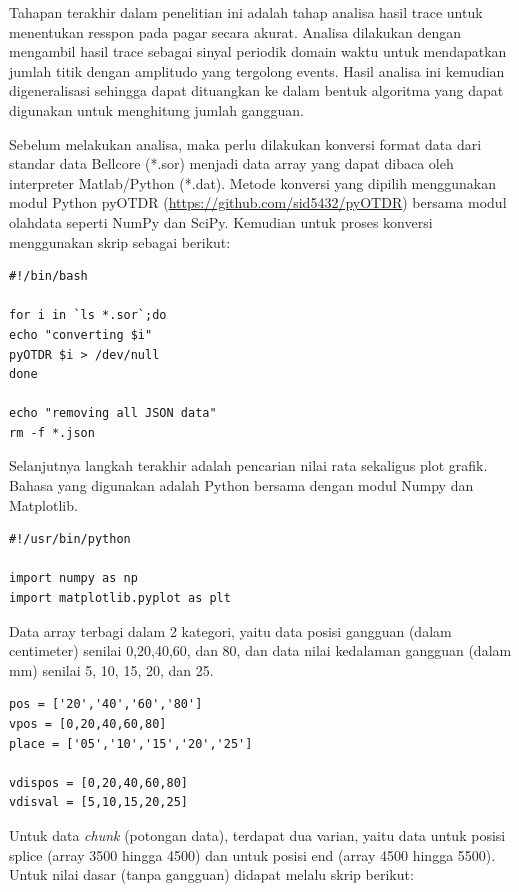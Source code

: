 \documentclass[12pt]{article}
\begin{document}
	Tahapan terakhir dalam penelitian ini adalah tahap analisa hasil trace untuk menentukan	resspon pada pagar secara akurat.
	Analisa dilakukan dengan mengambil hasil trace sebagai sinyal periodik domain waktu untuk mendapatkan jumlah titik dengan amplitudo yang tergolong events.
	Hasil analisa ini kemudian digeneralisasi sehingga dapat dituangkan ke dalam bentuk algoritma yang dapat digunakan untuk menghitung jumlah gangguan.
	
	Sebelum melakukan analisa, maka perlu dilakukan konversi format data dari standar data Bellcore (*.sor) menjadi data array yang dapat dibaca oleh interpreter Matlab/Python (*.dat).
	Metode konversi yang dipilih menggunakan modul Python pyOTDR (\url{https://github.com/sid5432/pyOTDR}) bersama modul olahdata seperti NumPy dan SciPy.
	Kemudian untuk proses konversi menggunakan skrip sebagai berikut:
	
	\begin{verbatim}
#!/bin/bash

for i in `ls *.sor`;do
echo "converting $i"
pyOTDR $i > /dev/null
done

echo "removing all JSON data"
rm -f *.json
	\end{verbatim}
	
	Selanjutnya langkah terakhir adalah pencarian nilai rata sekaligus plot grafik.
	Bahasa yang digunakan adalah Python bersama dengan modul Numpy dan Matplotlib.
	
	\begin{verbatim}
#!/usr/bin/python

import numpy as np
import matplotlib.pyplot as plt
	\end{verbatim}
	
	Data array terbagi dalam 2 kategori, yaitu data posisi gangguan (dalam centimeter) senilai 0,20,40,60, dan 80, dan data nilai kedalaman gangguan (dalam mm) senilai 5, 10, 15, 20, dan 25.

	\begin{verbatim}
pos = ['20','40','60','80']
vpos = [0,20,40,60,80]
place = ['05','10','15','20','25']

vdispos = [0,20,40,60,80]
vdisval = [5,10,15,20,25]
	\end{verbatim}
	
	Untuk data \textit{chunk} (potongan data), terdapat dua varian, yaitu data untuk posisi splice (array 3500 hingga 4500) dan untuk posisi end (array 4500 hingga 5500).
	Untuk nilai dasar (tanpa gangguan) didapat melalu skrip berikut:
	
\end{document}
